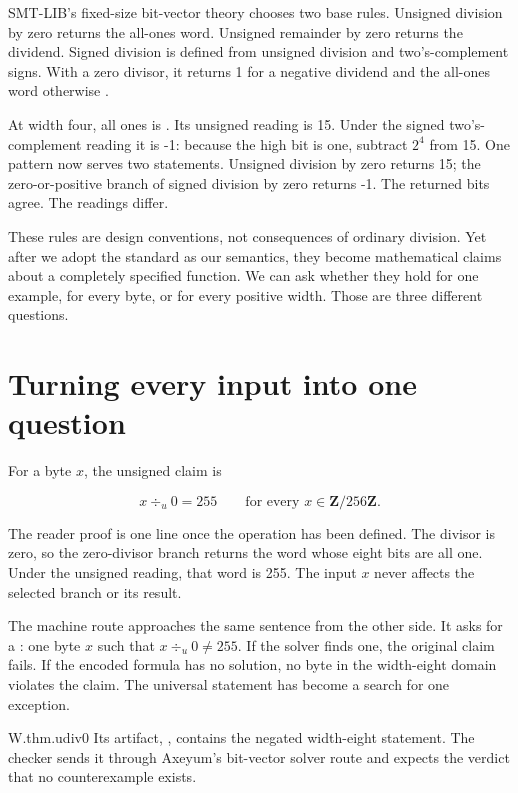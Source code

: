 SMT-LIB's fixed-size bit-vector theory chooses two base rules. Unsigned
division by zero returns the all-ones word. Unsigned remainder by zero returns
the dividend. Signed division is defined from unsigned division and
two's-complement signs. With a zero divisor, it returns 1 for a negative
dividend and the all-ones word otherwise \autocite{smtlibfixedbv}.

At width four, all ones is . Its unsigned reading is 15. Under the
signed two's-complement reading it is -1: because the high bit is one, subtract
\(2^4\) from 15. One pattern now serves two statements. Unsigned division by
zero returns 15; the zero-or-positive branch of signed division by zero returns
-1. The returned bits agree. The readings differ.

These rules are design conventions, not consequences of ordinary division.
Yet after we adopt the standard as our semantics, they become mathematical
claims about a completely specified function. We can ask whether they hold
for one example, for every byte, or for every positive width. Those are three
different questions.

\section{Turning every input into one question}
\label{sec:refuting-opposite}

For a byte \(x\), the unsigned claim is

\[
x\div_u0=255
\qquad\mbox{for every }x\in\mathbf{Z}/256\mathbf{Z}.
\]

The reader proof is one line once the operation has been defined. The divisor
is zero, so the zero-divisor branch returns the word whose eight bits are all
one. Under the unsigned reading, that word is 255. The input \(x\) never
affects the selected branch or its result.

The machine route approaches the same sentence from the other side. It asks
for a : one byte \(x\) such that
\(x\div_u0\ne255\). If the solver finds one, the original claim fails. If the
encoded formula has no solution, no byte in the width-eight domain violates
the claim. The universal statement has become a search for one exception.

\begin{artifact}{W.thm.udiv0}
Its artifact, , contains the negated
width-eight statement. The checker sends it through Axeyum's bit-vector solver
route and expects the verdict that no counterexample exists.
\end{artifact}

